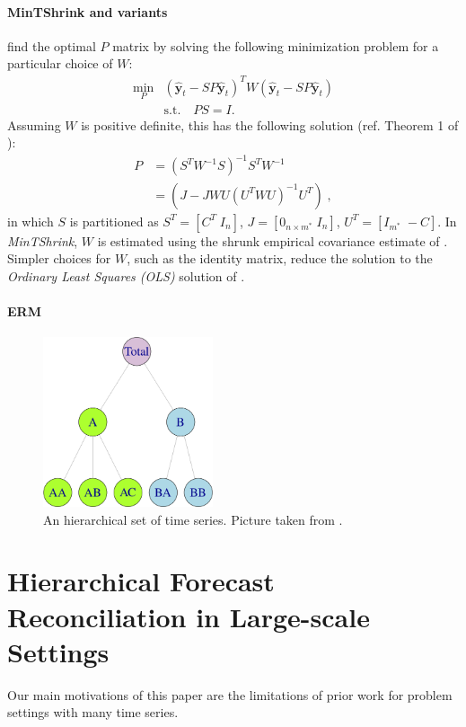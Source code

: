 \documentclass{article}
\begin{document}
  \paragraph{MinTShrink and variants} \citet{wickramasuriya_optimal_2019} find the optimal \(P\) matrix by solving the following minimization problem for a particular choice of \(W\):
  \begin{align}
    \min_P &(\hat{\textbf{y}}_{t} - SP\hat{\textbf{y}}_{t})^T W (\hat{\textbf{y}}_{t} - SP\hat{\textbf{y}}_{t}) \nonumber \\
    & \text{s.t.} \quad PS=I.
  \end{align}
  Assuming \(W\) is positive definite, this has the following solution (ref. Theorem 1 of \cite{wickramasuriya_optimal_2019}):
  \begin{align} 
    P &= (S^TW^{-1}S)^{-1}S^TW^{-1} \nonumber \\
      &= (J - JWU(U^TWU)^{-1}U^T) \;, \label{eq:p1}
  \end{align}
  in which \(S\) is partitioned as \(S^T = [C^T \; I_n]\), \(J = [0_{n \times m^*} \; I_n]\), \(U^T = [I_{m^*} \; -C]\). In \textit{MinTShrink}, \(W\) is estimated using the shrunk empirical covariance estimate of \cite{schafer_shrinkage_2005}. Simpler choices for \(W\), such as the identity matrix, reduce the solution to the \textit{Ordinary Least Squares (OLS)} solution of \cite{hyndman_optimal_2011}.

  \paragraph{ERM} \citet{bentaieb_regularized_2019} 

  \begin{figure}[t]
    \centering
    \includegraphics[height=5cm]{./assets/hts.png}
    \caption{An hierarchical set of time series. Picture taken from \cite{hyndman_forecasting_2021}.}
    \label{fig:hts}
  \end{figure}

\section{Hierarchical Forecast Reconciliation in Large-scale Settings}   \label{sec:ourwork}
Our main motivations of this paper are the limitations of prior work for problem settings with many time series.
\end{document}
